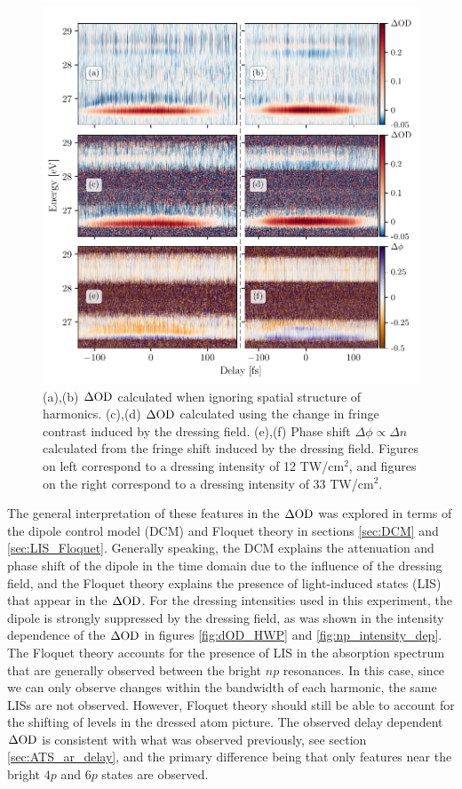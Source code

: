 \begin{figure}
	\centering
	\includegraphics[width=1.0\textwidth]{figures/CATS/delay_high_low.pdf}
	\caption[Delay-dependent $\dod$ and $\Delta \phi$ measured at high and moderate dressing intensities]{(a),(b) $\dod$ calculated when ignoring spatial structure of harmonics.  (c),(d)  $\dod$ calculated using the change in fringe contrast induced by the dressing field.  (e),(f) Phase shift $\Delta\phi\propto\Delta n $ calculated from the fringe shift induced by the dressing field.  Figures on left correspond to a dressing intensity of 12 TW/cm$^2$, and figures on the right correspond to a dressing intensity of 33 TW/cm$^2$.}
	\label{fig:delay_high_low}
\end{figure}

The general interpretation of these features in the $\dod$ was explored in terms of the dipole control model (DCM) and Floquet theory in sections \ref{sec:DCM} and \ref{sec:LIS_Floquet}.  Generally speaking, the DCM explains the attenuation and phase shift of the dipole in the time domain due to the influence of the dressing field, and the Floquet theory explains the presence of light-induced states (LIS) that appear in the $\dod$.  For the dressing intensities used in this experiment, the dipole is strongly suppressed by the dressing field, as was shown in the intensity dependence of the $\dod$ in figures \ref{fig:dOD_HWP} and \ref{fig:np_intensity_dep}.  The Floquet theory accounts for the presence of LIS in the absorption spectrum that are generally observed between the bright $np$ resonances.  In this case, since we can only observe changes within the bandwidth of each harmonic, the same LISs are not observed.  However, Floquet theory should still be able to account for the shifting of levels in the dressed atom picture.  The observed delay dependent $\dod$ is consistent with what was observed previously, see section \ref{sec:ATS_ar_delay}, and the primary difference being that only features near the bright $4p$ and $6p$ states are observed.

